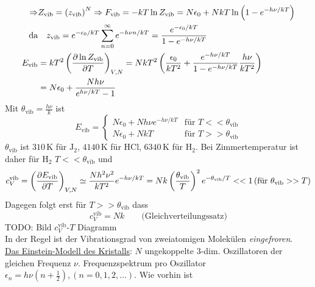 \begin{enumerate}[A)]
\begin{equation}
        \begin{split}
            \Rightarrow & Z_\text{vib} = \left( z_\text{vib} \right)^N \Rightarrow F_\text{vib} = - k T \ln Z_\text{vib} = N \epsilon_0 + N k T \ln \left( 1 - e^{- h \nu / kT} \right)  \\
            \text{da} &\quad  z_\text{vib} = e^{-\epsilon_0/kT} \sum_{n=0}^{\infty} e^{-h\nu n/kT} = \frac{e^{-\epsilon_0 / kT}}{1 - e^{- h \nu / kT}} \\
            E_\text{vib} &= k T^2 \left( \frac{\partial \ln Z_\text{vib}}{\partial T} \right)_{V, N} = N k T^2 \left( \frac{\epsilon_0}{k T^2} + \frac{e^{-h \nu / k T}}{1 - e^{- h \nu / kT}} \frac{h \nu}{k T^2} \right) \\
            &= N \epsilon_0 + \frac{N h \nu}{e^{h \nu / k T} - 1}
        \end{split}
    \end{equation}
    Mit $\theta_\text{vib} = \frac{h \nu}{k}$ ist
    \begin{equation}
        E_\text{vib} =
        \begin{cases}
            N \epsilon_0 + N h \nu e^{- h \nu / kT} & \text{für } T << \theta_\text{vib} \\
            N \epsilon_0 + N k T & \text{für } T >> \theta_\text{vib}
        \end{cases}
    \end{equation}
    $\theta_\text{vib}$ ist $310\,$K für $\text{J}_2$, $4140\,$K für HCl, $6340\,$K für H$_2$. Bei Zimmertemperatur ist daher für H$_2$ $T<<\theta_\text{vib}$ und
    \begin{equation}
        c_V^\text{vib} = \left( \frac{\partial E_\text{vib}}{\partial T} \right)_{V, N} \simeq \frac{N h^2 \nu^2}{k T^2} e^{- h \nu / k T} = N k \left( \frac{\theta_\text{vib}}{T} \right)^2 e^{- \theta_\text{vib} / T} << 1  \left( \text{für } \theta_\text{vib} >> T \right)
    \end{equation}
    Dagegen folgt erst für $T >> \theta_\text{vib}$ dass
    \begin{equation}
        c_V^\text{vib} = N k \qquad \text{(Gleichverteilungssatz)}
    \end{equation}
    TODO: Bild $c_V^\text{vib}$-$T$ Diagramm \\%
    In der Regel ist der Vibrationsgrad von zweiatomigen Molekülen \emph{eingefroren}. \\[\baselineskip]
    \underline{Das Einstein-Modell des Kristalls}: $N$ ungekoppelte 3-dim. Oszillatoren der gleichen Frequenz $\nu$.
    Frequenzspektrum pro Oszillator $\epsilon_n = h \nu \left( n + \frac{1}{2} \right), (n=0, 1, 2, \ldots)$. Wie vorhin ist

\end{enumerate}
